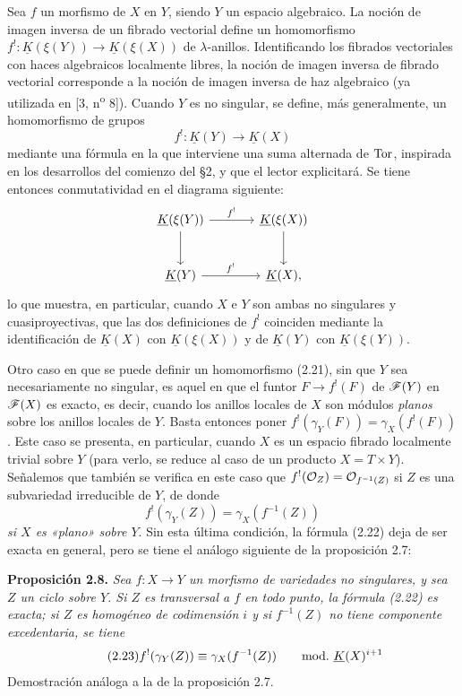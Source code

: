 Sea $f$ un morfismo de $X$ en $Y$, siendo $Y$ un espacio algebraico. La noción de imagen inversa de un fibrado vectorial define un homomorfismo $f^!:\underline K(\xi(Y))\longrightarrow\underline K(\xi(X))$ de $\lambda$-anillos. Identificando los fibrados vectoriales con haces algebraicos localmente libres, la noción de imagen inversa de fibrado vectorial corresponde a la noción de imagen inversa de haz algebraico (ya utilizada en [3, n\textsuperscript{o} 8]). Cuando $Y$ es no singular, se define, más generalmente, un homomorfismo de grupos
\begin{equation}\tag{2.21}
 f^!:\underline K(Y)\longrightarrow\underline K(X)
\end{equation}
mediante una fórmula en la que interviene una suma alternada de $\operatorname{Tor}$, inspirada en los desarrollos del comienzo del \S 2, y que el lector explicitará. Se tiene entonces conmutatividad en el diagrama siguiente:
\[
\begin{tikzcd}[column sep=large,row sep=large]
\underline K(\xi(Y)) \arrow[r,"f^!"] \arrow[d] & \underline K(\xi(X)) \arrow[d]\\
\underline K(Y) \arrow[r,"f^!"] & \underline K(X){,}
\end{tikzcd}
\]
lo que muestra, en particular, cuando $X$ e $Y$ son ambas no singulares y cuasiproyectivas, que las dos definiciones de $f^!$ coinciden mediante la identificación de $\underline K(X)$ con $\underline K(\xi(X))$ y de $\underline K(Y)$ con $\underline K(\xi(Y))$.

Otro caso en que se puede definir un homomorfismo (2.21), sin que $Y$ sea necesariamente no singular, es aquel en que el funtor $F\to f^!(F)$ de $\mathscr F(Y)$ en $\mathscr F(X)$ es exacto, es decir, cuando los anillos locales de $X$ son módulos \emph{planos} sobre los anillos locales de $Y$. Basta entonces poner $f^!(\gamma_Y(F))=\gamma_X(f^!(F))$.
Este caso se presenta, en particular, cuando $X$ es un espacio fibrado localmente trivial sobre $Y$ (para verlo, se reduce al caso de un producto $X=T\times Y$). Señalemos que también se verifica en este caso que $f^!(\mathcal O_Z)=\mathcal O_{f^{-1}(Z)}$ si $Z$ es una subvariedad irreducible de $Y$, de donde
\begin{equation}\tag{2.22}
 f^!(\gamma_Y(Z))=\gamma_X(f^{-1}(Z))
\end{equation}
\emph{si $X$ es «plano» sobre $Y$}. Sin esta última condición, la fórmula (2.22) deja de ser exacta en general, pero se tiene el análogo siguiente de la proposición 2.7:

\textbf{Proposición 2.8.} \emph{Sea $f:X\longrightarrow Y$ un morfismo de variedades no singulares, y sea $Z$ un ciclo sobre $Y$. Si $Z$ es transversal a $f$ en todo punto, la fórmula (2.22) es exacta; si $Z$ es homogéneo de codimensión $i$ y si $f^{-1}(Z)$ no tiene componente excedentaria, se tiene}
\begin{equation}\tag{2.23}
 f^!(\gamma_Y(Z))\equiv\gamma_X(f^{-1}(Z))\sisi{.}{}\qquad\mathrm{mod.}\ \underline K(X)^{i+1}
\end{equation}
Demostración análoga a la de la proposición 2.7.

